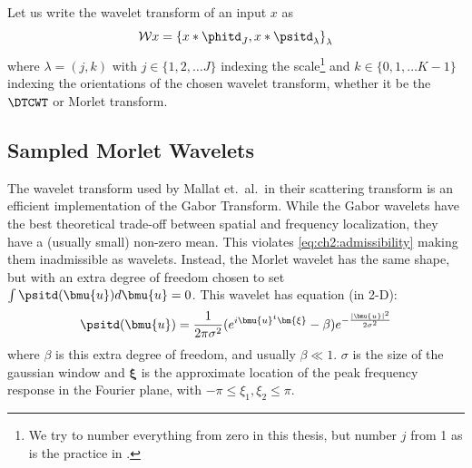 Let us write the wavelet transform of an input $x$ as
\begin{equation}
  \mathcal{W}x = \left\{x \ast \phitd_J, x \ast \psitd_{\lambda} \right\}_{\lambda} \label{eq:ch2:wave2}
\end{equation}
where $\lambda = (j,k)$ with $j\in \{1, 2,\ldots J\}$ indexing the
scale\footnote{We try to number everything from zero in this thesis, but number
$j$ from 1 as is the practice in \cite{kingsbury_complex_2001,
selesnick_dual-tree_2005}.} and $k \in \{0, 1, \ldots K-1\}$ indexing the
orientations of the chosen wavelet transform, whether it be the $\DTCWT$ or
Morlet transform.

\subsection{Sampled Morlet Wavelets}\label{sec:ch2:morlet_fourier}
  The wavelet transform used by Mallat et.\ al.\ in their scattering transform is an efficient
  implementation of the Gabor Transform.  While the Gabor wavelets have the best
  theoretical trade-off between spatial and frequency localization, they have a
  (usually small) non-zero mean.  This violates \eqref{eq:ch2:admissibility} making them
  inadmissible as wavelets. Instead, the Morlet wavelet has the same shape, but
  with an extra degree of freedom chosen to set $\int \psitd (\bmu{u}) d\bmu{u}
  =0$. This wavelet has equation (in 2-D):
  \begin{equation}
    \psitd(\bmu{u}) = \frac{1}{2\pi\sigma^2} {(e^{i\bmu{u}^t\bm{\xi}} - \beta)}
                     e^{-\frac{|\bmu{u}|^2}{2\sigma^2}}
    \label{eq:ch2:morlet}
  \end{equation}
  where $\beta$ is this extra degree of freedom, and usually $\beta\ll 1$.
  $\sigma$ is the size of the gaussian window and $\bm{\xi}$ is the
  approximate location of the peak frequency response in the Fourier plane, with
  $-\pi \leq \xi_1, \xi_2 \leq \pi$.


